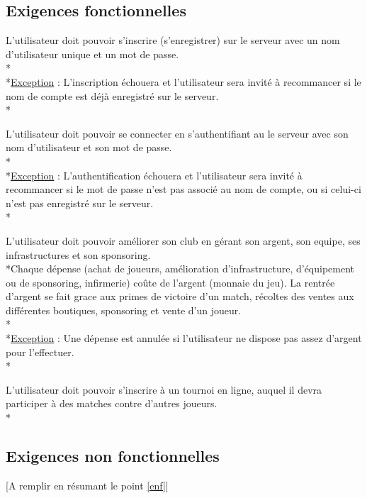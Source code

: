 \documentclass[a4paper]{article}
\begin{document}
	\subsection{Exigences fonctionnelles}
		\begin{description}[style=nextline]
			\item[Inscription :]L'utilisateur doit pouvoir s'inscrire (s'enregistrer) sur le serveur avec un nom d'utilisateur unique et un mot de passe.\\*\\*\underline{Exception} : L'inscription échouera et l'utilisateur sera invité à recommancer si le nom de compte est déjà enregistré sur le serveur.\\*
			\item[Connection :]L'utilisateur doit pouvoir se connecter en s'authentifiant au le serveur avec son nom d'utilisateur et son mot de passe.\\*\\*\underline{Exception} : L'authentification échouera et l'utilisateur sera invité à recommancer si le mot de passe n'est pas associé au nom de compte, ou si celui-ci n'est pas enregistré sur le serveur.\\*
			\item[Management :]L'utilisateur doit pouvoir améliorer son \gls{club} en gérant son argent, son \gls{equipe}, ses infrastructures et son sponsoring.\\*Chaque dépense (achat de joueurs, amélioration d'infrastructure, d'équipement ou de sponsoring, infirmerie) coûte de l'argent (monnaie du jeu). La rentrée d'argent se fait grace aux primes de victoire d'un match, récoltes des ventes aux différentes boutiques, sponsoring et vente d'un joueur.\\*\\*\underline{Exception} : Une dépense est annulée si l'utilisateur ne dispose pas assez d'argent pour l'effectuer.\\*
			\item[Tournois :]L'utilisateur doit pouvoir s'inscrire à un tournoi en ligne, auquel il devra participer à des matches contre d'autres joueurs.\\*
		\end{description}

\subsection{Exigences non fonctionnelles}
[A remplir en résumant le point \ref{enf}]
\end{document}
